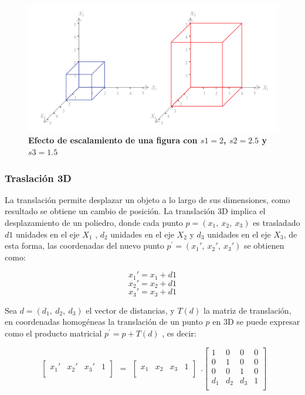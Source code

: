 \begin{center}
\begin{figure}[h]
\includegraphics[width=12cm]{Img/GEO/geo-escala.jpg}
\centering
\caption{\textbf{\footnotesize{Efecto de escalamiento de una figura con $s1=2$, $s2=2.5$ y $s3=1.5$}}}
\end{figure}
\end{center}

\subsubsection{Traslación 3D}
La translación permite desplazar un objeto a lo largo de sus dimensiones, como resultado se obtiene un cambio de posición. La translación 3D implica el desplazamiento de un poliedro, donde cada punto $p = (x_{1},\ x_{2},\ x_{3})$ es trasladado $d1$ unidades en el eje $X_1$ , $d_2$ unidades en el eje $X_2$ y $d_3$ unidades en el eje $X_3$, de esta forma, las coordenadas del nuevo punto
$p^{\prime} = (x_{1}{\prime}, \ x_{2}{\prime}, \ x_{3}{\prime})$ se obtienen como:

$$x_{1}{\prime} = x_{1} + d1$$
$$x_{2}{\prime} = x_{2} + d1$$
$$x_{3}{\prime} = x_{3} + d1$$

Sea $d = (d_{1},\ d_{2},\ d_{3})$ el vector de distancias, y $T(d)$ la matriz de translación, en
coordenadas homogéneas la translación de un punto $p$ en 3D se puede expresar como el producto matricial $p^{\prime} = p + T(d)$ , es decir:

\begin{equation}
\begin{array}{rccl}
\left[
\begin{array}{rccl}
x_{1}{\prime} & x_{2}{\prime} & x_{3}{\prime} & 1\\
\end{array}
\right]
\end{array}
=
\begin{array}{rccl}
\left[
\begin{array}{rccl}
x_{1} & x_{2} & x_{3} & 1\\
\end{array}
\right]
\end{array} 
.
\left[
\begin{array}{rccl}
1 & 0 & 0 & 0\\
0 & 1 & 0 & 0\\
0 & 0 & 1 & 0\\
d_{1} & d_{2} & d_{3} & 1\\
\end{array}
\right]
\end{equation}

